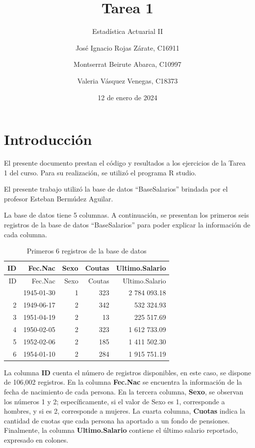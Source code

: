 \documentclass[
]{article}
\title{Tarea 1}
\subtitle{Estadística Actuarial II}
\author{José Ignacio Rojas Zárate, C16911 \and Montserrat Beirute
Abarca, C10997 \and Valeria Vásquez Venegas, C18373}
\date{12 de enero de 2024}
\begin{document}
\maketitle

{
\setcounter{tocdepth}{2}
\tableofcontents
}
\hypertarget{introducciuxf3n}{%
\section{Introducción}\label{introducciuxf3n}}

El presente documento prestan el código y resultados a los ejercicios de
la Tarea 1 del curso. Para su realización, se utilizó el programa R
studio.

El presente trabajo utilizó la base de datos ``BaseSalarios'' brindada
por el profesor Esteban Bermúdez Aguilar.

La base de datos tiene 5 columnas. A continuación, se presentan los
primeros seis registros de la base de datos ``BaseSalarios'' para poder
explicar la información de cada columna.

\begin{longtable}[]{@{}rrrrr@{}}
\caption{Primeros 6 registros de la base de datos}\tabularnewline
\toprule\noalign{}
ID & Fec.Nac & Sexo & Coutas & Ultimo.Salario \\
\midrule\noalign{}
\endfirsthead
\toprule\noalign{}
ID & Fec.Nac & Sexo & Coutas & Ultimo.Salario \\
\midrule\noalign{}
\endhead
\bottomrule\noalign{}
\endlastfoot
1 & 1945-01-30 & 1 & 323 & 2 784 093.18 \\
2 & 1949-06-17 & 2 & 342 & 532 324.93 \\
3 & 1951-04-19 & 2 & 13 & 225 517.69 \\
4 & 1950-02-05 & 2 & 323 & 1 612 733.09 \\
5 & 1952-02-06 & 2 & 185 & 1 411 502.30 \\
6 & 1954-01-10 & 2 & 284 & 1 915 751.19 \\
\end{longtable}

La columna \textbf{ID} cuenta el número de registros disponibles, en
este caso, se dispone de 106,002 registros. En la columna
\textbf{Fec.Nac} se encuentra la información de la fecha de nacimiento
de cada persona. En la tercera columna, \textbf{Sexo}, se observan los
números 1 y 2; específicamente, si el valor de Sexo es 1, corresponde a
hombres, y si es 2, corresponde a mujeres. La cuarta columna,
\textbf{Cuotas} indica la cantidad de cuotas que cada persona ha
aportado a un fondo de pensiones. Finalmente, la columna
\textbf{Ultimo.Salario} contiene el último salario reportado, expresado
en colones.
\end{document}
